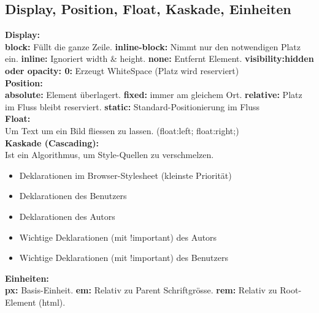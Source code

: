 \documentclass[7pt,landscape,a4paper]{scrartcl}
\begin{document}
\begin{multicols*}{4}
\subsection{Display, Position, Float, Kaskade, Einheiten}
	\textcolor{b}{\textbf{Display:}}\\
	\textbf{block:} Füllt die ganze Zeile. \textbf{inline-block:} Nimmt nur den notwendigen Platz ein. \textbf{inline:} Ignoriert width \& height. \textbf{none:} Entfernt Element. \textbf{visibility:hidden oder opacity: 0:} Erzeugt WhiteSpace (Platz wird reserviert)\\
	\textcolor{b}{\textbf{Position:}}\\
	\textbf{absolute:} Element überlagert. \textbf{fixed:} immer am gleichem Ort. \textbf{relative:} Platz im Fluss bleibt reserviert. \textbf{static:} Standard-Positionierung im Fluss\\
	\textcolor{b}{\textbf{Float:}}\\
	Um Text um ein Bild fliessen zu lassen. (float:left; float:right;)\\
	\textcolor{b}{\textbf{Kaskade (Cascading):}}\\
	Ist ein Algorithmus, um Style-Quellen zu verschmelzen.
	\begin{itemize}[topsep=0pt, leftmargin=3mm]
		\setlength\itemsep{-0.3em}
		\item Deklarationen im Browser-Stylesheet (kleinste Priorität)
		\item Deklarationen des Benutzers
		\item Deklarationen des Autors
		\item Wichtige Deklarationen (mit !important) des Autors
		\item Wichtige Deklarationen (mit !important) des Benutzers
	\end{itemize}
	\textcolor{b}{\textbf{Einheiten:}}\\
	\textbf{px:} Basis-Einheit. \textbf{em:} Relativ zu Parent Schriftgrösse. \textbf{rem:} Relativ zu Root-Element (html).

\end{multicols*}
\end{document}

